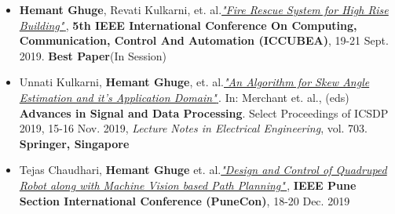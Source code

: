 \documentclass[10pt,a4paper,times]{moderncv}
\let\orighref\href
\renewcommand{\hrefer}[2]{\orighref{#1}{#2\,\faExternalLink}}
\begin{document}
\begin{itemize}

    \item \textbf{Hemant Ghuge}, Revati Kulkarni, et$.$ al.\hrefer{https://ieeexplore.ieee.org/document/9128377}{\textit{"Fire Rescue System for High Rise Building"}}, \textbf{5th IEEE International Conference On Computing, Communication, Control And Automation (ICCUBEA)}, 19-21 Sept. 2019. \textbf{Best Paper}(In Session)
    
    \vspace{0.2cm}
    
    \item Unnati Kulkarni, \textbf{Hemant Ghuge}, et$.$ al.\hrefer{https://www.springer.com/gp/book/9789811583902}{\textit{"An Algorithm for Skew Angle Estimation and it’s Application Domain"}}. In: Merchant et$.$ al., (eds) \textbf{Advances in Signal and Data Processing}. Select Proceedings of ICSDP 2019, 15-16 Nov. 2019, \textit{Lecture Notes in Electrical Engineering}, vol. 703. \textbf{Springer, Singapore}
    
    \vspace{0.2cm}
    
    \item Tejas Chaudhari, \textbf{Hemant Ghuge} et$.$ al.\hrefer{https://ieeexplore.ieee.org/document/9105783}{\textit{"Design and Control of Quadruped Robot along with Machine Vision based Path Planning"}}, \textbf{IEEE Pune Section International Conference (PuneCon)}, 18-20 Dec. 2019

\end{itemize}
\end{document}
